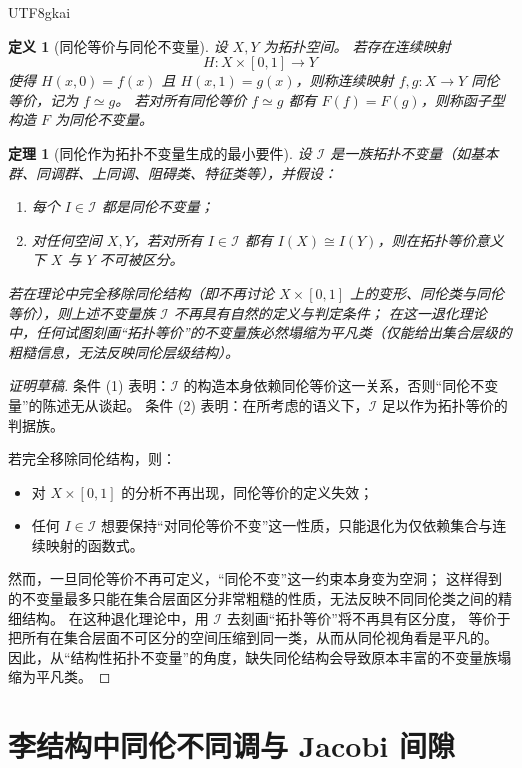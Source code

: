 \documentclass[12pt]{article}
\newtheorem{definition}{定义}[section]
\newtheorem{theorem}{定理}[section]
\begin{document}
\begin{CJK*}{UTF8}{gkai}
\begin{definition}[同伦等价与同伦不变量]
设 $X,Y$ 为拓扑空间。
若存在连续映射
\[
H\colon X\times[0,1]\to Y
\]
使得 $H(x,0)=f(x)$ 且 $H(x,1)=g(x)$，则称连续映射 $f,g\colon X\to Y$ \emph{同伦等价}，记为 $f\simeq g$。
若对所有同伦等价 $f\simeq g$ 都有 $F(f)=F(g)$，则称函子型构造 $F$ 为\emph{同伦不变量}。
\end{definition}

\begin{theorem}[同伦作为拓扑不变量生成的最小要件]\label{thm:homotopy-minimal}
设 $\mathcal{I}$ 是一族拓扑不变量（如基本群、同调群、上同调、阻碍类、特征类等），并假设：
\begin{enumerate}
  \item 每个 $I\in\mathcal{I}$ 都是同伦不变量；
  \item 对任何空间 $X,Y$，若对所有 $I\in\mathcal{I}$ 都有 $I(X)\cong I(Y)$，则在拓扑等价意义下 $X$ 与 $Y$ 不可被区分。
\end{enumerate}
若在理论中完全移除同伦结构（即不再讨论 $X\times[0,1]$ 上的变形、同伦类与同伦等价），则上述不变量族 $\mathcal{I}$ 不再具有自然的定义与判定条件；
在这一退化理论中，任何试图刻画“拓扑等价”的不变量族必然塌缩为平凡类（仅能给出集合层级的粗糙信息，无法反映同伦层级结构）。
\end{theorem}

\begin{proof}[证明草稿]
条件 (1) 表明：$\mathcal{I}$ 的构造本身依赖同伦等价这一关系，否则“同伦不变量”的陈述无从谈起。
条件 (2) 表明：在所考虑的语义下，$\mathcal{I}$ 足以作为拓扑等价的判据族。

若完全移除同伦结构，则：
\begin{itemize}
  \item 对 $X\times[0,1]$ 的分析不再出现，同伦等价的定义失效；
  \item 任何 $I\in\mathcal{I}$ 想要保持“对同伦等价不变”这一性质，只能退化为仅依赖集合与连续映射的函数式。
\end{itemize}
然而，一旦同伦等价不再可定义，“同伦不变”这一约束本身变为空洞；
这样得到的不变量最多只能在集合层面区分非常粗糙的性质，无法反映不同同伦类之间的精细结构。
在这种退化理论中，用 $\mathcal{I}$ 去刻画“拓扑等价”将不再具有区分度，
等价于把所有在集合层面不可区分的空间压缩到同一类，从而从同伦视角看是平凡的。
因此，从“结构性拓扑不变量”的角度，缺失同伦结构会导致原本丰富的不变量族塌缩为平凡类。
\end{proof}


\section{李结构中同伦不同调与 Jacobi 间隙}


\end{CJK*}
\end{document}
